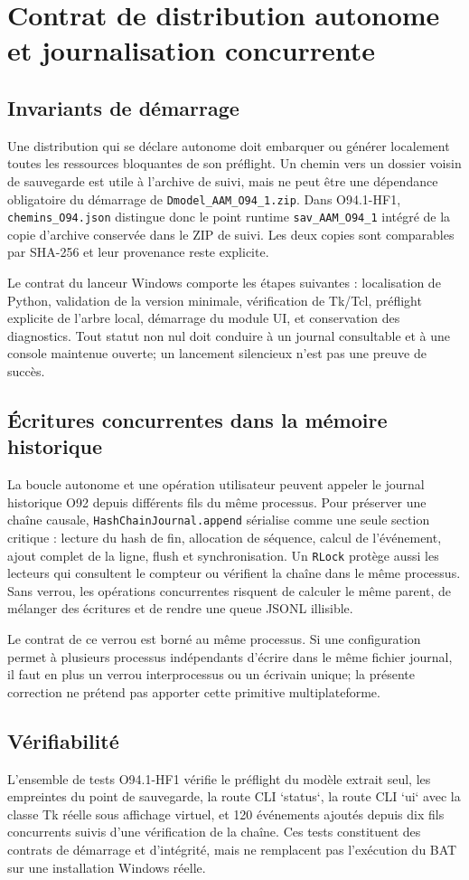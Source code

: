 \documentclass[11pt,a4paper]{article}
\begin{document}
\section{Contrat de distribution autonome et journalisation concurrente}

\subsection{Invariants de démarrage}
Une distribution qui se déclare autonome doit embarquer ou générer localement toutes les ressources bloquantes de son préflight. Un chemin vers un dossier voisin de sauvegarde est utile à l'archive de suivi, mais ne peut être une dépendance obligatoire du démarrage de \texttt{Dmodel\_AAM\_O94\_1.zip}. Dans O94.1-HF1, \texttt{chemins\_O94.json} distingue donc le point runtime \texttt{sav\_AAM\_O94\_1} intégré de la copie d'archive conservée dans le ZIP de suivi. Les deux copies sont comparables par SHA-256 et leur provenance reste explicite.

Le contrat du lanceur Windows comporte les étapes suivantes : localisation de Python, validation de la version minimale, vérification de Tk/Tcl, préflight explicite de l'arbre local, démarrage du module UI, et conservation des diagnostics. Tout statut non nul doit conduire à un journal consultable et à une console maintenue ouverte; un lancement silencieux n'est pas une preuve de succès.

\subsection{Écritures concurrentes dans la mémoire historique}
La boucle autonome et une opération utilisateur peuvent appeler le journal historique O92 depuis différents fils du même processus. Pour préserver une chaîne causale, \texttt{HashChainJournal.append} sérialise comme une seule section critique : lecture du hash de fin, allocation de séquence, calcul de l'événement, ajout complet de la ligne, flush et synchronisation. Un \texttt{RLock} protège aussi les lecteurs qui consultent le compteur ou vérifient la chaîne dans le même processus. Sans verrou, les opérations concurrentes risquent de calculer le même parent, de mélanger des écritures et de rendre une queue JSONL illisible.

Le contrat de ce verrou est borné au même processus. Si une configuration permet à plusieurs processus indépendants d'écrire dans le même fichier journal, il faut en plus un verrou interprocessus ou un écrivain unique; la présente correction ne prétend pas apporter cette primitive multiplateforme.

\subsection{Vérifiabilité}
L'ensemble de tests O94.1-HF1 vérifie le préflight du modèle extrait seul, les empreintes du point de sauvegarde, la route CLI `status`, la route CLI `ui` avec la classe Tk réelle sous affichage virtuel, et 120 événements ajoutés depuis dix fils concurrents suivis d'une vérification de la chaîne. Ces tests constituent des contrats de démarrage et d'intégrité, mais ne remplacent pas l'exécution du BAT sur une installation Windows réelle.
\end{document}
